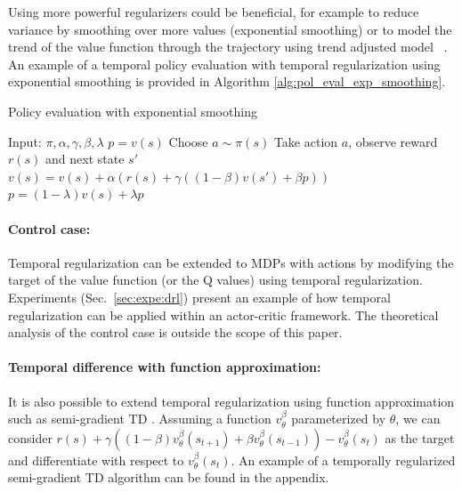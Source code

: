 \documentclass{article}
\newcommand{\param}{\beta}
\newcommand{\V}{v}
\begin{document}
Using more powerful regularizers could be beneficial, for example to reduce variance by smoothing over more values (exponential smoothing) or to model the trend of the value function through the trajectory using trend adjusted model ~\cite{gardner1985exponential}. An example of a temporal policy evaluation with temporal regularization using exponential smoothing is provided in Algorithm \ref{alg:pol_eval_exp_smoothing}.
\begin{algorithm}[H]
\caption{Policy evaluation with exponential smoothing}
\begin{spacing}{1.2}
\begin{algorithmic}[1]
    \STATE Input: $\pi,\alpha,\gamma,\param,\lambda$
    \STATE $p = \V(s)$
        \STATE Choose $a \sim \pi(s)$
        \STATE Take action $a$, observe reward $r(s)$ and next state $s'$
        \STATE $\V(s) = \V(s) +  \alpha (r(s) + \gamma ( (1-\param) \V(s') + \param p)) $
        \STATE $p = (1-\lambda)\V(s) + \lambda p$
    \ENDFOR
\end{algorithmic}
\end{spacing}
\label{alg:pol_eval_exp_smoothing}
\end{algorithm}

\paragraph{Control case:} 
Temporal regularization can be extended to MDPs with actions by  modifying the target of the value function (or the Q values) using temporal regularization. Experiments (Sec.~\ref{sec:expe:drl}) present an example of how temporal regularization can be applied within an actor-critic framework. The theoretical analysis of the control case is outside the scope of this paper.

\paragraph{Temporal difference with function approximation:}
It is also possible to extend temporal regularization using function approximation such as  semi-gradient TD \cite{sutton2017reinforcement}. 
Assuming a function $\V_{\theta}^{\param}$ parameterized by $\theta$, we can consider $r(s) + \gamma ((1-\param)\V_{\theta}^{\param}(s_{t+1}) + \param \V_{\theta}^{\param}(s_{t-1})) - \V_{\theta}^{\param}(s_t)$  as the target and differentiate with respect to $\V_{\theta}^{\param}(s_{t})$. An example of a temporally regularized semi-gradient TD algorithm can be found in the appendix.
\end{document}
